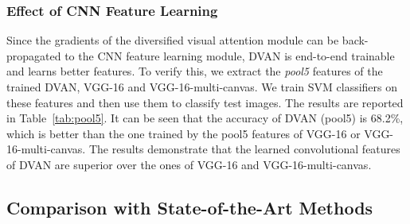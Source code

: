 \documentclass[journal]{IEEEtran}
\begin{document}
\subsubsection{Effect of CNN Feature Learning} Since the gradients of the diversified visual attention module can be back-propagated to the CNN feature learning module, DVAN is end-to-end trainable and learns better features. To verify this, we extract the \textit{pool5} features of the trained DVAN, VGG-16 and VGG-16-multi-canvas. We train SVM classifiers on these features and then use them to classify test images. The results are reported in Table~\ref{tab:pool5}. It can be seen that the accuracy of DVAN (pool5) is 68.2\%, which is better than the one trained by the pool5 features of VGG-16 or VGG-16-multi-canvas. The results demonstrate that the learned convolutional features of DVAN are superior over the ones of VGG-16 and VGG-16-multi-canvas.
\subsection{Comparison with State-of-the-Art Methods}
\end{document}
